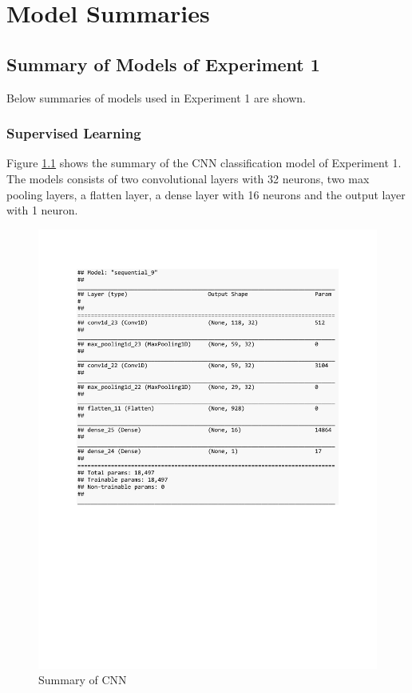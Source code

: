 
\chapter{Model Summaries} %

\label{AppendixA} %

\section{Summary of Models of Experiment 1}

Below summaries of models used in Experiment 1 are shown.

\subsection{Supervised Learning}

Figure \ref{fig:summary_CNN_class_syn} shows the summary of the CNN classification model of Experiment 1. The models consists of two convolutional layers with 32 neurons, two max pooling layers, a flatten layer, a dense layer with 16 neurons and the output layer with 1 neuron. 
\begin{figure}[h]
	\centering
	\includegraphics[scale=0.45]{Figures/summary_CNN_class_syn}
	\decoRule
	\caption[Experiment 1: Summary of CNNs for supervised learning]{Summary of CNN \parencite{own}}
	\label{fig:summary_CNN_class_syn}
\end{figure}


